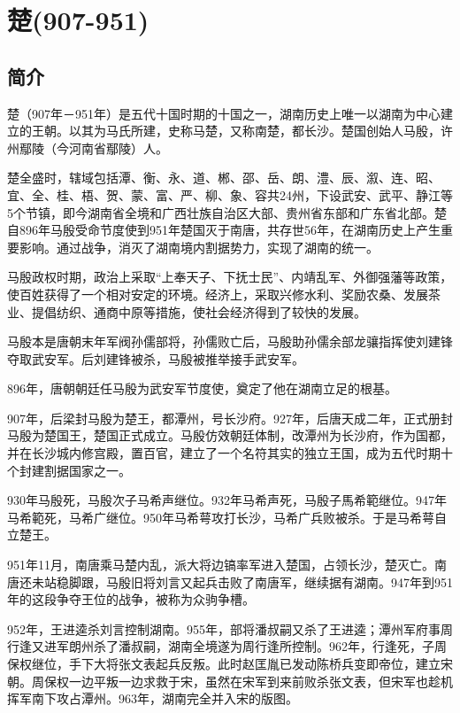 

\section{楚\tiny(907-951)}

\subsection{简介}

楚（907年－951年）是五代十国时期的十国之一，湖南历史上唯一以湖南为中心建立的王朝。以其为马氏所建，史称马楚，又称南楚，都长沙。楚国创始人马殷，许州鄢陵（今河南省鄢陵）人。

楚全盛时，辖域包括潭、衡、永、道、郴、邵、岳、朗、澧、辰、溆、连、昭、宜、全、桂、梧、贺、蒙、富、严、柳、象、容共24州，下设武安、武平、静江等5个节镇，即今湖南省全境和广西壮族自治区大部、贵州省东部和广东省北部。楚自896年马殷受命节度使到951年楚国灭于南唐，共存世56年，在湖南历史上产生重要影响。通过战争，消灭了湖南境内割据势力，实现了湖南的统一。

马殷政权时期，政治上采取“上奉天子、下抚士民”、内靖乱军、外御强藩等政策，使百姓获得了一个相对安定的环境。经济上，采取兴修水利、奖励农桑、发展茶业、提倡纺织、通商中原等措施，使社会经济得到了较快的发展。

马殷本是唐朝末年军阀孙儒部将，孙儒败亡后，马殷助孙儒余部龙骧指挥使刘建锋夺取武安军。后刘建锋被杀，马殷被推举接手武安军。

896年，唐朝朝廷任马殷为武安军节度使，奠定了他在湖南立足的根基。

907年，后梁封马殷为楚王，都潭州，号长沙府。927年，后唐天成二年，正式册封马殷为楚国王，楚国正式成立。马殷仿效朝廷体制，改潭州为长沙府，作为国都，并在长沙城内修宫殿，置百官，建立了一个名符其实的独立王国，成为五代时期十个封建割据国家之一。

930年马殷死，马殷次子马希声继位。932年马希声死，马殷子馬希範继位。947年马希範死，马希广继位。950年马希萼攻打长沙，马希广兵败被杀。于是马希萼自立楚王。

951年11月，南唐乘马楚内乱，派大将边镐率军进入楚国，占领长沙，楚灭亡。南唐还未站稳脚跟，马殷旧将刘言又起兵击败了南唐军，继续据有湖南。947年到951年的这段争夺王位的战争，被称为众驹争槽。

952年，王进逵杀刘言控制湖南。955年，部将潘叔嗣又杀了王进逵；潭州军府事周行逢又进军朗州杀了潘叔嗣，湖南全境遂为周行逢所控制。962年，行逢死，子周保权继位，手下大将张文表起兵反叛。此时赵匡胤已发动陈桥兵变即帝位，建立宋朝。周保权一边平叛一边求救于宋，虽然在宋军到来前败杀张文表，但宋军也趁机挥军南下攻占潭州。963年，湖南完全并入宋的版图。

